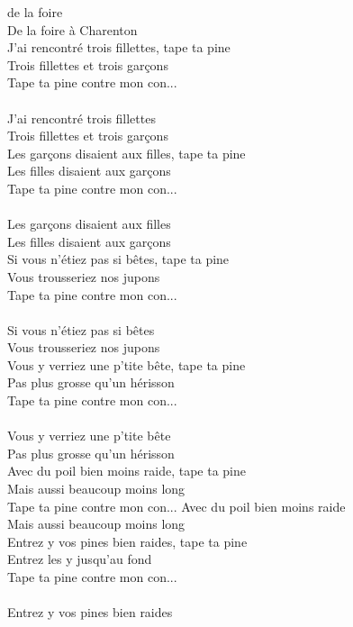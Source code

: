 
 de la foire
\\De la foire à Charenton
\\J'ai rencontré trois fillettes, tape ta pine
\\Trois fillettes et trois garçons
\\Tape ta pine contre mon con...
\\\\J'ai rencontré trois fillettes
\\Trois fillettes et trois garçons
\\Les garçons disaient aux filles, tape ta pine
\\Les filles disaient aux garçons
\\Tape ta pine contre mon con...
\\\\Les garçons disaient aux filles
\\Les filles disaient aux garçons
\\Si vous n'étiez pas si bêtes, tape ta pine
\\Vous trousseriez nos jupons
\\Tape ta pine contre mon con...
\\\\Si vous n'étiez pas si bêtes
\\Vous trousseriez nos jupons
\\Vous y verriez une p'tite bête, tape ta pine
\\Pas plus grosse qu'un hérisson
\\Tape ta pine contre mon con...
\\\\Vous y verriez une p'tite bête
\\Pas plus grosse qu'un hérisson
\\Avec du poil bien moins raide, tape ta pine
\\Mais aussi beaucoup moins long
\\Tape ta pine contre mon con...
\breakpage
Avec du poil bien moins raide
\\Mais aussi beaucoup moins long
\\Entrez y vos pines bien raides, tape ta pine
\\Entrez les y jusqu'au fond
\\Tape ta pine contre mon con...
\\\\Entrez y vos pines bien raides

